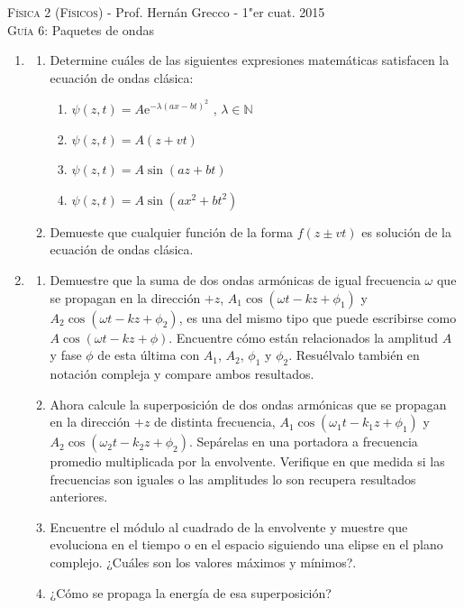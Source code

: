 \documentclass[11pt,spanish,a4paper]{article}
\begin{document}
\begin{center}
	\textsc{\large Física 2 (Físicos)} - Prof. Hernán Grecco - 1"er cuat. 2015\\
	\textsc{\large Guía 6:}	Paquetes de ondas
\end{center}

\begin{enumerate}
\item
\begin{enumerate}
	\item Determine cuáles de las siguientes expresiones matemáticas satisfacen la ecuación de ondas clásica:
	\begin{enumerate}
		\item \(\psi(z,t)= A \mathrm{e}^{-\lambda (a x- b t)^2}\) , \(\lambda \in \mathbb{N} \)
		\item \(\psi(z,t)= A (z+ v t ) \)
		\item \(\psi(z,t)= A \sin{\left( a z+ b t \right) } \)
		\item \(\psi(z,t)= A \sin{\left( a x^2+ b t^2 \right) } \)
	\end{enumerate}
	\item Demueste que cualquier función de la forma \(f(z \pm v t ) \) es solución de la ecuación de ondas clásica.
\end{enumerate}



\item 
	\begin{enumerate}
		\item Demuestre que la suma de dos ondas armónicas de igual frecuencia \( \omega \) que se propagan en la dirección \(+z\), \(A_1 \cos{\left( \omega t - k z + \phi_1 \right) } \) y \( A_2 \cos{\left( \omega t - k z + \phi_2 \right) } \), es una del mismo tipo que puede escribirse como \( A \cos{\left( \omega t - k z + \phi \right) } \).
		Encuentre cómo están relacionados la amplitud \(A\) y fase \(\phi\) de esta última con \(A_1\), \(A_2\), \(\phi_1\) y \(\phi_2\).
		Resuélvalo también en notación compleja y compare ambos resultados.
	\item Ahora calcule la superposición de dos ondas armónicas que se propagan en la dirección \(+z\) de distinta frecuencia, \(A_1 \cos{\left( \omega_1 t - k_1 z + \phi_1 \right) } \) y \(A_2 \cos{\left( \omega_2 t - k_2 z + \phi_2 \right) } \).
		Sepárelas en una portadora a frecuencia promedio multiplicada por la envolvente.
		Verifique en que medida si las frecuencias son iguales o las amplitudes lo son recupera resultados anteriores.
		\item Encuentre el módulo al cuadrado de la envolvente y muestre que evoluciona en el tiempo o en el espacio siguiendo una elipse en el plano complejo.
		¿Cuáles son los valores máximos y mínimos?.
		\item ¿Cómo se propaga la energía de esa superposición?
	\end{enumerate}
		



\end{enumerate}
\end{document}
